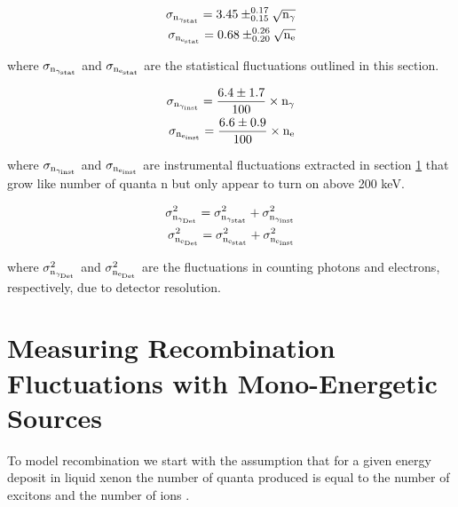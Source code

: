 \begin{equation}
\begin{split}
\rm  \sigma_{n_{\gamma_{stat}}} = 3.45\pm_{0.15}^{0.17} \sqrt{n_\gamma}\\
\rm \sigma_{n_{e_{stat}}} = 0.68\pm_{0.20}^{0.26} \sqrt{n_e}
\label{eq:SigStat}
\end{split}
\end{equation}

\noindent where  $\rm \sigma_{n_{\gamma_{stat}}}$ and $\rm \sigma_{n_{e_{stat}}}$ are the statistical fluctuations outlined in this section.

\begin{equation}
\begin{split}
\rm  \sigma_{n_{\gamma_{inst}}} = \frac{6.4\pm 1.7}{100} \times n_\gamma\\
\rm  \sigma_{n_{e_{inst}}} = \frac{6.6\pm 0.9}{100} \times n_e
\label{eq:SigInst}
\end{split}
\end{equation}

\noindent where  $\rm \sigma_{n_{\gamma_{inst}}}$ and $\rm \sigma_{n_{e_{inst}}}$ are instrumental fluctuations extracted in section \ref{sec:flucs_mono} that grow like number of quanta n but only appear to turn on above 200 keV.

\begin{equation}
\begin{split}
\rm  \sigma_{n_{\gamma_{Det}}}^2 = \sigma_{n_{\gamma_{stat}}}^2 + \sigma_{n_{\gamma_{inst}}}^2 \\
\rm \sigma_{n_{e_{Det}}}^2 = \sigma_{n_{e_{stat}}}^2 + \sigma_{n_{e_{inst}}}^2
\label{eq:SigDet}
\end{split}
\end{equation}

\noindent where  $\rm \sigma_{n_{\gamma_{Det}}}^2$ and $\rm \sigma_{n_{e_{Det}}}^2$ are the fluctuations in counting photons and electrons, respectively, due to detector resolution.


\section{Measuring Recombination Fluctuations with Mono-Energetic Sources}
\label{sec:flucs_mono}

To model recombination we start with the assumption that for a given energy deposit in liquid xenon the number of quanta produced is equal to the number of excitons and the number of ions \cite{Platzman}. 

